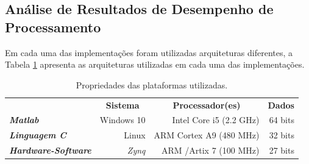  
\subsection{Análise de Resultados de Desempenho de Processamento}

Em cada uma das implementações foram utilizadas arquiteturas diferentes, a Tabela \ref{propriedades} apresenta as arquiteturas utilizadas em cada uma das implementações.  

\begin{table}[!h]
	\centering
	\caption{Propriedades das plataformas utilizadas.}
	\label{propriedades}
	\begin{tabular}{lrrr}
		\rowcolor[HTML]{DAE8FC} 
		\multicolumn{1}{c}{\cellcolor[HTML]{DAE8FC}\textbf{Implementação}} & \multicolumn{1}{c}{\cellcolor[HTML]{DAE8FC}\textbf{Sistema}} & \multicolumn{1}{c}{\cellcolor[HTML]{DAE8FC}\textbf{Processador(es)}} & \multicolumn{1}{c}{\cellcolor[HTML]{DAE8FC}\textbf{Dados}} \\
		\textit{\textbf{Matlab}}                                        & Windows 10                                                   & Intel Core i5 (2.2 GHz)                                              & 64 bits                                                    \\
		\rowcolor[HTML]{DAE8FC} 
		\textit{\textbf{Linguagem C}}                                   & Linux                                                        & ARM Cortex A9 (480 MHz)                                              & 32 bits                                                    \\
		\textit{\textbf{Hardware-Software}}                             & \textit{Zynq}                                                & ARM /Artix 7 (100 MHz)                                               & 27 bits                                                   
	\end{tabular}
\end{table}



